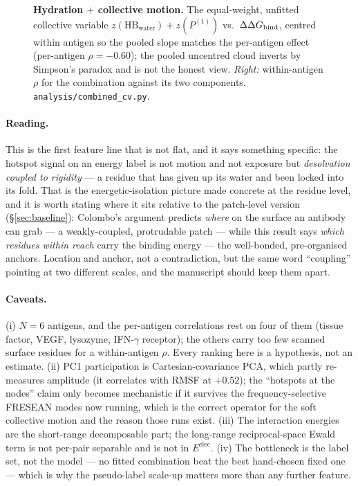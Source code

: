 \begin{figure}[H]\centering
{}
\caption{\textbf{Hydration $+$ collective motion.} The equal-weight, unfitted collective variable
$z(\mathrm{HB}_{\mathrm{water}})+z(P^{(1)})$ vs.\ $\Delta\Delta G_{\mathrm{bind}}$, centred within antigen so the pooled slope
matches the per-antigen effect (per-antigen $\rho=-0.60$); the pooled uncentred cloud inverts by
Simpson's paradox and is not the honest view. \emph{Right:} within-antigen $\rho$ for the combination
against its two components. \texttt{analysis/combined\_cv.py}.}
\label{fig:combined-cv}
\end{figure}

\paragraph{Reading.} This is the first feature line that is not flat, and it says something specific:
the hotspot signal on an energy label is not motion and not exposure but \emph{desolvation coupled to
rigidity} --- a residue that has given up its water and been locked into its fold. That is the
energetic-isolation picture made concrete at the residue level, and it is worth stating where it sits
relative to the patch-level version (\S\ref{sec:baseline}): Colombo's argument predicts \emph{where} on
the surface an antibody can grab --- a weakly-coupled, protrudable patch --- while this result says
\emph{which residues within reach} carry the binding energy --- the well-bonded, pre-organised anchors.
Location and anchor, not a contradiction, but the same word ``coupling'' pointing at two different
scales, and the manuscript should keep them apart.

\paragraph{Caveats.} (i) $N=6$ antigens, and the per-antigen correlations rest on four of them (tissue
factor, VEGF, lysozyme, IFN-$\gamma$ receptor); the others carry too few scanned surface residues for a
within-antigen $\rho$. Every ranking here is a hypothesis, not an estimate. (ii) PC1 participation is
Cartesian-covariance PCA, which partly re-measures amplitude (it correlates with RMSF at $+0.52$); the
``hotspots at the nodes'' claim only becomes mechanistic if it survives the frequency-selective
FRESEAN modes now running, which is the correct operator for the soft collective motion and the reason
those runs exist. (iii) The interaction energies are the short-range decomposable part; the long-range
reciprocal-space Ewald term is not per-pair separable and is not in $E^{\mathrm{elec}}$. (iv) The
bottleneck is the label set, not the model --- no fitted combination beat the best hand-chosen fixed
one --- which is why the pseudo-label scale-up matters more than any further feature.
